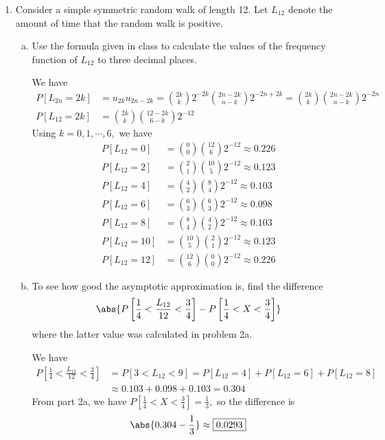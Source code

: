 \documentclass{article}
\begin{document}
\begin{enumerate}[(1)]
\begin{enumerate}[(a)]
		\end{enumerate}

	\item Consider a simple symmetric random walk of length 12. Let $L_{12}$ denote the amount of time that the random walk is positive.

		\begin{enumerate}[(a)]
			\item Use the formula given in class to calculate the values of the frequency function of $L_{12}$ to three decimal places.
				\begin{soln}
					We have
					\begin{align*}
						P[L_{2n}=2k] &= u_{2k}u_{2n-2k} = \binom{2k}{k}2^{-2k} \binom{2n-2k}{n-k}2^{-2n+2k} = \binom{2k}{k}\binom{2n-2k}{n-k}2^{-2n} \\
						P[L_{12}=2k] &= \binom{2k}{k}\binom{12-2k}{6-k}2^{-12}
					\end{align*}
					Using $k=0, 1, \cdots, 6,$ we have
					\begin{align*}
						P[L_{12}=0] &= \binom{0}{0}\binom{12}{6}2^{-12} \approx 0.226 \\
						P[L_{12}=2] &= \binom{2}{1}\binom{10}{5}2^{-12}\approx0.123 \\
						P[L_{12}=4] &= \binom{4}{2}\binom{8}{4}2^{-12} \approx 0.103 \\
						P[L_{12}=6] &= \binom{6}{3}\binom{6}{3}2^{-12} \approx 0.098 \\
						P[L_{12}=8] &= \binom{8}{4}\binom{4}{2}2^{-12}\approx0.103 \\
						P[L_{12}=10] &= \binom{10}{5}\binom{2}{1}2^{-12}\approx0.123 \\
						P[L_{12}=12] &= \binom{12}{6}\binom{0}{0}2^{-12} \approx 0.226
					\end{align*}
				\end{soln}

			\item To see how good the asymptotic approximation is, find the difference
				\[\abs{P\left[ \frac{1}{4}<\frac{L_{12}}{12}<\frac{3}{4} \right]-P\left[ \frac{1}{4}<X<\frac{3}{4} \right]}\]
				where the latter value was calculated in problem 2a.
				\begin{soln}
					We have
					\begin{align*}
						P\left[ \frac{1}{4}<\frac{L_{12}}{12}<\frac{3}{4} \right] &= P\left[ 3 < L_{12} < 9 \right] = P[L_{12}=4] + P[L_{12}=6] + P[L_{12}=8] \\
						&\approx 0.103 + 0.098 + 0.103 = 0.304
					\end{align*}
					From part 2a, we have $P[\frac{1}{4}<X<\frac{3}{4}] = \frac{1}{3},$ so the difference is
					\[\abs{0.304 - \frac{1}{3}} \approx \boxed{0.0293}\]
				\end{soln}


\end{enumerate}
\end{enumerate}
\end{document}
